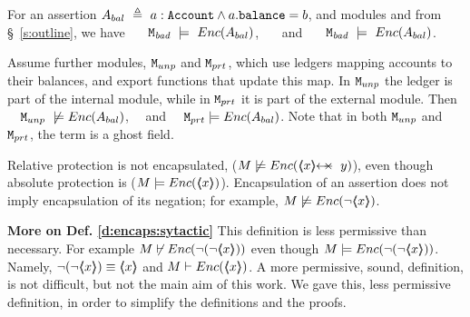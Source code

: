 \begin{example}
\label{ex:not:encaps}
For an assertion $A_{bal}\  \triangleq\ a:\prg{Account}\wedge a.\prg{balance}=b$, %
and modules \ModB and  \ModC  from \S~\ref{s:outline}, we have  \ \ \ $\mbox{\normalfont{\texttt{M}}}_{{\textit{bad}}}\ \models\ {Enc(  A_{bal}  )}$, \ \ \ and \ \ \ $\mbox{\normalfont{\texttt{M}}}_{{\textit{bad}}}\ \models\ {Enc(  A_{bal}  )}$.
\end{example}


\begin{example} Assume   further modules, $\mbox{\normalfont{\texttt{M}}}_{{unp}}$ and $\mbox{\normalfont{\texttt{M}}}_{{prt}}$,  which  use ledgers mapping  accounts to their balances, and export functions that update this map. In  $\mbox{\normalfont{\texttt{M}}}_{{unp}}$ the ledger is  part of the {internal} module, %
while in $\mbox{\normalfont{\texttt{M}}}_{{prt}}$ it is part of the  {external} module.
Then  \ \ $\ModD \ \not\models\encaps{ A_{bal}} $, \ \  and \ \ $\mbox{\normalfont{\texttt{M}}}_{{prt}}  \models {\ensuremath Enc(  A_{bal} )} $.
Note that in both $\mbox{\normalfont{\texttt{M}}}_{{unp}}$ and $\mbox{\normalfont{\texttt{M}}}_{{prt}}$, the term  is a ghost field. 
\end{example}

\begin{note} Relative protection %
is not encapsulated, (\eg $M \not\models {\encaps{\protectedFrom{x}{y}}}$), even though    absolute protection is
(\eg $M \models {\ensuremath Enc( \ensuremath{\langle\!\!\langle x \rangle\!\!\rangle} )}$).
Encapsulation of an assertion does not imply encapsulation of its negation; 
 for example,  $M \not\models {{\ensuremath Enc( \neg\ensuremath{\langle\!\!\langle x \rangle\!\!\rangle} )}}$.
\end{note}

\noindent
\textbf{More on Def. \ref{d:encaps:sytactic}} This definition is less permissive than necessary. 
For example $M \not\vdash {\ensuremath Enc( \neg ( {\neg \ensuremath{\langle\!\!\langle x \rangle\!\!\rangle}}) )}$ even though 
 $M  \models {\ensuremath Enc( \neg ( {\neg \ensuremath{\langle\!\!\langle x \rangle\!\!\rangle}}) )}$.
 Namely, 
$\neg (\neg \inside {x}) \equiv  \inside {x}$ and $M \vdash {{\ensuremath Enc(   \ensuremath{\langle\!\!\langle x \rangle\!\!\rangle} )}}$.
A more permissive, sound, definition, is not difficult, but not the main aim of this work.
We gave this, less permissive definition, in order to simplify the definitions and the proofs. 


 \vspace{.1cm}

